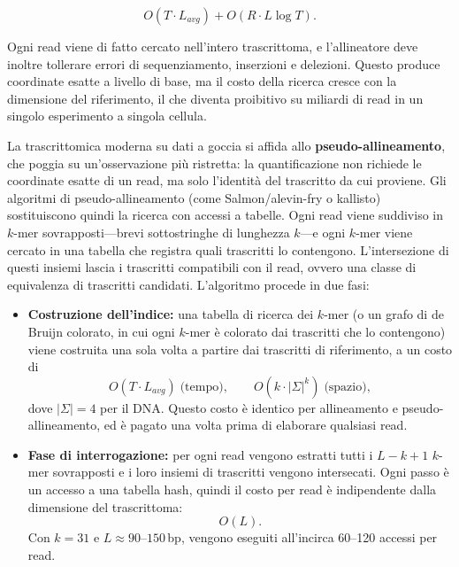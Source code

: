 $$O(T \cdot L_{avg}) + O(R \cdot L \log T).$$

Ogni read viene di fatto cercato nell'intero trascrittoma, e l'allineatore deve inoltre tollerare errori di sequenziamento, inserzioni e delezioni. Questo produce coordinate esatte a livello di base, ma il costo della ricerca cresce con la dimensione del riferimento, il che diventa proibitivo su miliardi di read in un singolo esperimento a singola cellula.

La trascrittomica moderna su dati a goccia si affida allo \textbf{pseudo-allineamento}, che poggia su un'osservazione più ristretta: la quantificazione non richiede le coordinate esatte di un read, ma solo l'identità del trascritto da cui proviene. Gli algoritmi di pseudo-allineamento (come Salmon/alevin-fry o kallisto) sostituiscono quindi la ricerca con accessi a tabelle. Ogni read viene suddiviso in $k$-mer sovrapposti---brevi sottostringhe di lunghezza $k$---e ogni $k$-mer viene cercato in una tabella che registra quali trascritti lo contengono. L'intersezione di questi insiemi lascia i trascritti compatibili con il read, ovvero una classe di equivalenza di trascritti candidati\cite{he2022alevin}. L'algoritmo procede in due fasi:

\begin{itemize}
    \item \textbf{Costruzione dell'indice:} una tabella di ricerca dei $k$-mer (o un grafo di de Bruijn colorato, in cui ogni $k$-mer è colorato dai trascritti che lo contengono) viene costruita una sola volta a partire dai trascritti di riferimento, a un costo di
    $$O(T \cdot L_{avg}) \;\text{(tempo)}, \qquad O(k \cdot |\Sigma|^k) \;\text{(spazio)},$$
    dove $|\Sigma|=4$ per il DNA. Questo costo è identico per allineamento e pseudo-allineamento, ed è pagato una volta prima di elaborare qualsiasi read.
    
    \item \textbf{Fase di interrogazione:} per ogni read vengono estratti tutti i $L-k+1$ $k$-mer sovrapposti e i loro insiemi di trascritti vengono intersecati. Ogni passo è un accesso a una tabella hash, quindi il costo per read è indipendente dalla dimensione del trascrittoma:
    $$O(L).$$ Con $k=31$ e $L \approx 90$--$150$\,bp, vengono eseguiti all'incirca 60--120 accessi per read.
\end{itemize}

